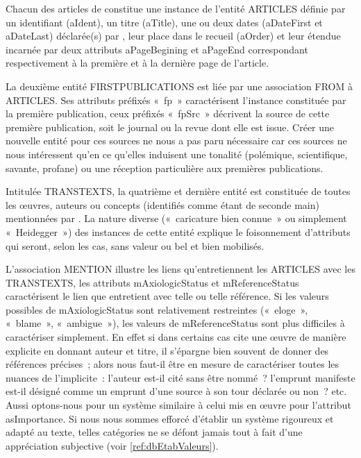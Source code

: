 Chacun des articles de \punr{} constitue une instance de l'entité ARTICLES définie par un identifiant (aIdent), un titre (aTitle), une ou deux dates (aDateFirst et aDateLast) déclarée(s) par \robbe{}, leur place dans le recueil (aOrder) et leur étendue incarnée par deux attributs aPageBegining et aPageEnd correspondant respectivement à la première et à la dernière page de l'article.

La deuxième entité FIRSTPUBLICATIONS est liée par une association FROM à 
ARTICLES. Ses attributs préfixés «~fp~» caractérisent l'instance constituée par la première publication, ceux préfixés «~fpSrc~» décrivent la source de cette première publication, soit le journal ou la revue dont elle est issue. Créer une nouvelle entité pour ces sources ne nous a pas paru nécessaire car ces sources ne nous intéressent qu'en ce qu'elles induisent une tonalité (polémique, scientifique, savante, profane) ou une réception particulière aux premières publications.


Intitulée TRANSTEXTS, la quatrième et dernière entité est constituée de toutes les œuvres, auteurs ou concepts (identifiés comme étant de seconde main) mentionnées par \robbe{}. La nature diverse («~caricature bien connue~» ou simplement «~Heidegger~») des instances de cette entité explique le foisonnement d'attributs qui seront, selon les cas, sans valeur ou bel et bien mobilisés.

L'association MENTION illustre les liens qu'entretiennent les ARTICLES avec les TRANSTEXTS, les attributs mAxiologicStatus et mReferenceStatus caractérisent le lien que \punr{} entretient avec telle ou telle référence. Si les valeurs possibles de mAxiologicStatus sont relativement restreintes («~eloge~», «~blame~», «~ambigue~»), les valeurs de mReferenceStatus sont plus difficiles à caractériser simplement. En effet si dans certains cas \robbe{} cite une œuvre de manière explicite en donnant auteur et titre, il s'épargne bien souvent de donner des références précises~; alors nous faut-il être en mesure de caractériser toutes les nuances de l'implicite~: l'auteur est-il cité sans être nommé~? l'emprunt manifeste est-il désigné comme un emprunt d'une source à son tour déclarée ou non~? etc. Aussi optons-nous pour un système similaire à celui mis en œuvre pour l'attribut asImportance. Si nous nous sommes efforcé d'établir un système rigoureux et adapté au texte, telles catégories ne se défont jamais tout à fait d'une appréciation subjective (voir \ref{ref:dbEtabValeurs}).




